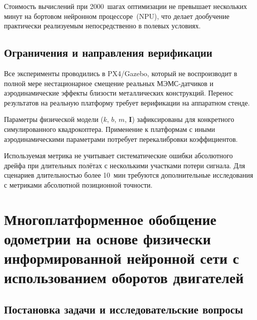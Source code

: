 Стоимость вычислений при 2000~шагах оптимизации не превышает нескольких минут
на бортовом нейронном процессоре~(NPU), что делает дообучение практически
реализуемым непосредственно в полевых условиях.

\subsection{Ограничения и направления верификации}

Все эксперименты проводились в PX4/Gazebo, который не воспроизводит в полной
мере нестационарное смещение реальных МЭМС-датчиков и аэродинамические эффекты
близости металлических конструкций.
Перенос результатов на реальную платформу требует верификации на аппаратном
стенде.

Параметры физической модели ($k$, $b$, $m$, $\mathbf{I}$) зафиксированы для
конкретного симулированного квадрокоптера.
Применение к платформам с иными аэродинамическими параметрами потребует
перекалибровки коэффициентов.

Используемая метрика не учитывает систематические ошибки абсолютного дрейфа
при длительных полётах с несколькими участками потери сигнала.
Для сценариев длительностью более 10~мин требуются дополнительные исследования
с метриками абсолютной позиционной точности.
%   

\section{Многоплатформенное обобщение одометрии на основе физически информированной нейронной сети с использованием оборотов двигателей}
\label{ch:multiplatform}

\subsection{Постановка задачи и исследовательские вопросы}
\label{sec:mp_motivation}

